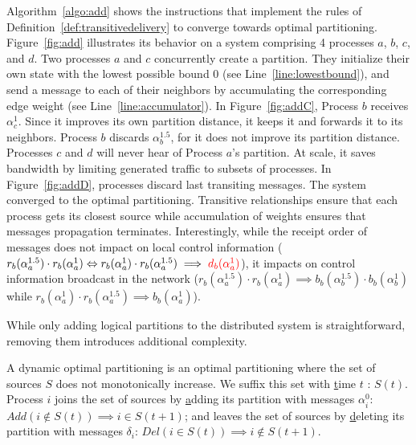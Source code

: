 Algorithm~\ref{algo:add} shows the instructions that implement the
rules of Definition~\ref{def:transitivedelivery} to converge towards
optimal partitioning. Figure~\ref{fig:add} illustrates its behavior on
a system comprising 4 processes $a$, $b$, $c$, and $d$. Two processes
$a$ and $c$ concurrently create a partition. They initialize their own
state with the lowest possible bound $0$ (see
Line~\ref{line:lowestbound}), and send a message to each of their
neighbors by accumulating the corresponding edge weight (see
Line~\ref{line:accumulator}). In Figure~\ref{fig:addC}, Process $b$
receives $\alpha_{c}^{1}$. Since it improves its own partition
distance, it keeps it and forwards it to its neighbors. Process $b$
discards $\alpha_{b}^{1.5}$, for it does not improve its partition
distance. Processes $c$ and $d$ will never hear of Process $a$'s
partition. At scale, it saves bandwidth by limiting generated traffic
to subsets of processes. In Figure~\ref{fig:addD}, processes discard
last transiting messages. The system converged to the optimal
partitioning.  Transitive relationships ensure that each process gets
its closest source while accumulation of weights ensures that messages
propagation terminates.  Interestingly, while the receipt order of
messages does not impact on local control information
($r_b(\alpha_a^{1.5}) \cdot r_b(\alpha_a^{1}) \Leftrightarrow
r_b(\alpha_a^{1}) \cdot r_b(\alpha_a^{1.5}) \implies
\textcolor{red}{d_b(\alpha_a^{1})}$), it impacts on control information
broadcast in the network ($r_b(\alpha_a^{1.5}) \cdot r_b(\alpha_a^{1})
\implies b_b(\alpha_{b}^{1.5}) \cdot b_b(\alpha_{b}^{1})$ while
$r_b(\alpha_a^{1}) \cdot r_b(\alpha_a^{1.5}) \implies
b_b(\alpha_a^{1})$).

While only adding logical partitions to the distributed system is
straightforward, removing them introduces additional complexity. 

\begin{definition}
  A dynamic optimal partitioning is an optimal partitioning where the
  set of sources $S$ does not monotonically increase. We suffix this
  set with \underline{t}ime $t$ : $S(t)$.  Process $i$ joins the set
  of sources by \underline{a}dding its partition with messages
  $\alpha_i^{0}$: $Add(i \not\in S(t)) \implies i \in S(t+1)$; and
  leaves the set of sources by \underline{d}eleting its partition with
  messages $\delta_i$: $Del(i \in S(t)) \implies i \not\in S(t+1)$.
\end{definition}


